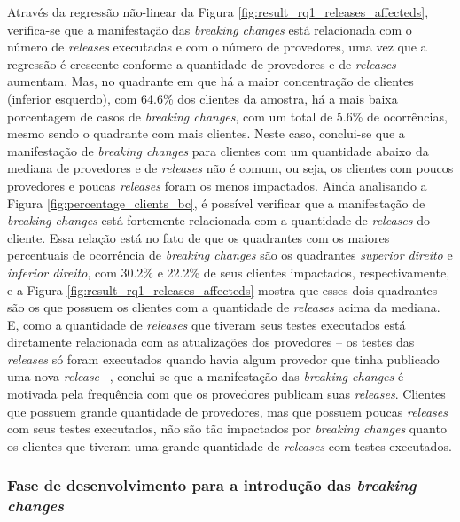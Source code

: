 Através da regressão não-linear da Figura \ref{fig:result_rq1_releases_affecteds}, verifica-se que a manifestação das \textit{breaking changes} está relacionada com o número de \textit{releases} executadas e com o número de provedores, uma vez que a regressão é crescente conforme a quantidade de provedores e de \textit{releases} aumentam. Mas, no quadrante em que há a maior concentração de clientes (inferior esquerdo), com 64.6\% dos clientes da amostra, há a mais baixa porcentagem de casos de \textit{breaking changes}, com um total de 5.6\% de ocorrências, mesmo sendo o quadrante com mais clientes. Neste caso, conclui-se que a manifestação de \textit{breaking changes} para clientes com um quantidade abaixo da mediana de provedores e de \textit{releases} não é comum, ou seja, os clientes com poucos provedores e poucas \textit{releases} foram os menos impactados. Ainda analisando a Figura \ref{fig:percentage_clients_bc}, é possível verificar que a manifestação de \textit{breaking changes} está fortemente relacionada com a quantidade de \textit{releases} do cliente. Essa relação está no fato de que os quadrantes com os maiores percentuais de ocorrência de \textit{breaking changes} são os quadrantes \textit{superior direito} e \textit{inferior direito}, com 30.2\% e 22.2\% de seus clientes impactados, respectivamente, e a Figura \ref{fig:result_rq1_releases_affecteds} mostra que esses dois quadrantes são os que possuem os clientes com a quantidade de \textit{releases} acima da mediana. E, como a quantidade de \textit{releases} que tiveram seus testes executados está diretamente relacionada com as atualizações dos provedores -- os testes das \textit{releases} só foram executados quando havia algum provedor que tinha publicado uma nova \textit{release} --, conclui-se que a manifestação das \textit{breaking changes} é motivada pela frequência com que os provedores publicam suas \textit{releases}. Clientes que possuem grande quantidade de provedores, mas que possuem poucas \textit{releases} com seus testes executados, não são tão impactados por \textit{breaking changes} quanto os clientes que tiveram uma grande quantidade de \textit{releases} com testes executados.

\subsubsection{Fase de desenvolvimento para a introdução das \textit{breaking changes}}

